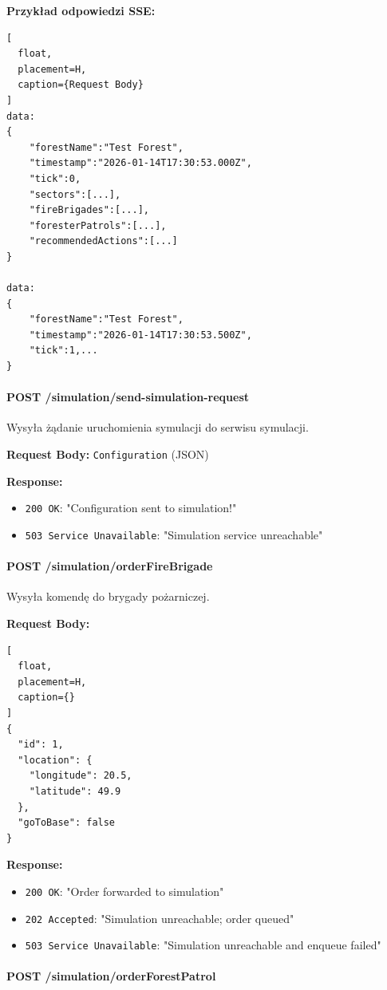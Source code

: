 \documentclass[11pt,a4paper] {article}
\begin{document}
\textbf{Przykład odpowiedzi SSE:}
\begin{lstlisting}[
  float,
  placement=H,
  caption={Request Body}
]
data: 
{  
    "forestName":"Test Forest",
    "timestamp":"2026-01-14T17:30:53.000Z",
    "tick":0,
    "sectors":[...],
    "fireBrigades":[...],
    "foresterPatrols":[...],
    "recommendedActions":[...]
}

data: 
{
    "forestName":"Test Forest",
    "timestamp":"2026-01-14T17:30:53.500Z",
    "tick":1,...
}
\end{lstlisting}

\paragraph{POST /simulation/send-simulation-request}

Wysyła żądanie uruchomienia symulacji do serwisu symulacji.

\textbf{Request Body:} \texttt{Configuration} (JSON)

\textbf{Response:}
\begin{itemize}
    \item \texttt{200 OK}: "Configuration sent to simulation!"
    \item \texttt{503 Service Unavailable}: "Simulation service unreachable"
\end{itemize}

\paragraph{POST /simulation/orderFireBrigade}

Wysyła komendę do brygady pożarniczej.

\textbf{Request Body:}
\begin{lstlisting}[
  float,
  placement=H,
  caption={}
]
{
  "id": 1,
  "location": {
    "longitude": 20.5,
    "latitude": 49.9
  },
  "goToBase": false
}
\end{lstlisting}

\textbf{Response:}
\begin{itemize}
    \item \texttt{200 OK}: "Order forwarded to simulation"
    \item \texttt{202 Accepted}: "Simulation unreachable; order queued"
    \item \texttt{503 Service Unavailable}: "Simulation unreachable and enqueue failed"
\end{itemize}

\paragraph{POST /simulation/orderForestPatrol}
\end{document}
